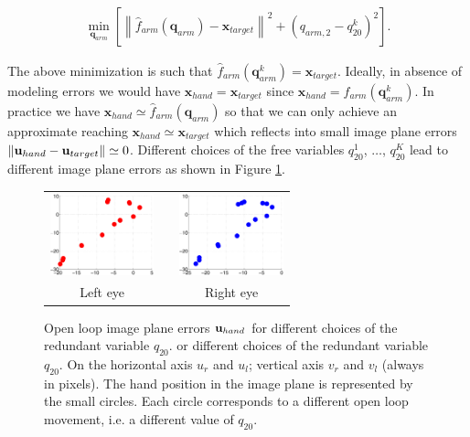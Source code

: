 \footnotesize{ 
  \begin{eqnarray} \label{Eq:OpenLoopMovements}
	\min_{\mathbf q_{arm}}
	\left[
	  \left\| \hat f_{arm}(\mathbf q_{arm}) - \mathbf x_{target}\right\|^2 + \left(q_{arm,2}-q_{20}^k\right)^2
	  \right].
  \end{eqnarray}
}

 The above minimization is such that $\hat f_{arm}(\mathbf q_{arm}^k) = \mathbf x_{target}$. Ideally, in absence
 of modeling errors we would have $ \mathbf x_{hand} = \mathbf x_{target}$ since $\mathbf x_{hand} = f_{arm}(\mathbf q_{arm}^k)$. In practice we have $\mathbf x_{hand} \simeq \hat f_{arm}(\mathbf q_{arm})$ 
 so that we can only achieve an approximate reaching $ \mathbf x_{hand} \simeq \mathbf x_{target}$ 
 which reflects into small image plane errors $\| \mathbf{u}_{hand} - \mathbf{u}_{target}\| \simeq 0$. Different choices 
 of the free variables $q_{20}^1$, $\dots$, $q_{20}^K$ lead to different image plane errors as shown 
 in Figure \ref{Fig:ImagePlaneOpenLoopErrors}.



\begin{figure}
  \begin{center}
	\begin{tabular}{ccc}
	  \parbox{30mm}{\includegraphics[width=30mm]{Figure/LeftEyeOpenLoop.eps}}  & \hspace{0.1cm} &
	  \parbox{30mm}{\includegraphics[width=30mm]{Figure/RightEyeOpenLoop.eps}}
	  \\
	  \parbox{30mm}{\centering Left eye } & \hspace{0.1cm} & \parbox{30mm}{\centering Right eye }
  \end{tabular}
\end{center}
\caption{Open loop image plane errors $\mathbf{u}_{hand}$ for different
choices of the redundant variable $q_{20}$. or different
choices of the redundant variable $q_{20}$. On the horizontal axis 
$u_r$ and $u_l$; vertical axis $v_r$ and $v_l$ (always in pixels).
The hand position in the image plane is represented 
by the small circles.  Each circle corresponds to a different open loop movement, i.e. a different value of $q_{20}$.
}\label{Fig:ImagePlaneOpenLoopErrors}
 \end{figure}


